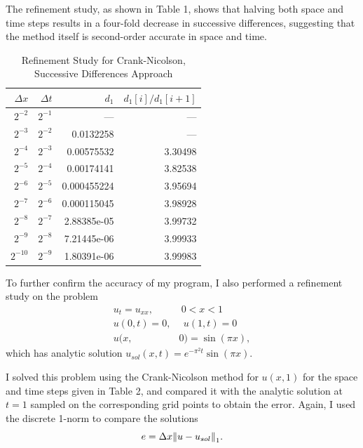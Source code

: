 \documentclass[12pt]{article}
\begin{document}
The refinement study, as shown in Table 1, shows that halving both space and time steps results in a four-fold decrease in successive differences, suggesting that the method itself is second-order accurate in space and time.
\begin{table}[H]
\caption{Refinement Study for Crank-Nicolson, Successive Differences Approach}
\centering\begin{tabular}{||r|r|r|r||}
\hline \hline
     $\Delta x$ &   $\Delta t$ &   $d_1$ &   $d_1[i]/d_1[i+1]$ \\
\hline 
 $2^{-2}$  & $2^{-1}$ & ---          &       ---       \\
 $2^{-3}$  & $2^{-2}$ & 0.0132258   &       --- \\
 $2^{-4}$  & $2^{-3}$ & 0.00575532  &       3.30498 \\
 $2^{-5}$  & $2^{-4}$ & 0.00174141  &       3.82538 \\
 $2^{-6}$  & $2^{-5}$ & 0.000455224 &       3.95694 \\
 $2^{-7}$  & $2^{-6}$ & 0.000115045 &       3.98928 \\
 $2^{-8}$  & $2^{-7}$ & 2.88385e-05 &       3.99732 \\
 $2^{-9}$  & $2^{-8}$ & 7.21445e-06 &       3.99933 \\
 $2^{-10}$ & $2^{-9}$ & 1.80391e-06 &       3.99983 \\
\hline \hline
\end{tabular}
\end{table}

To further confirm the accuracy of my program, I also performed a refinement study on the problem
\begin{align*}
u_t = u_{xx}, &\ 0<x<1 \\
u(0,t)=0, &\ \ u(1,t)=0 \\
u(x,&0) = \sin(\pi x),
\end{align*}
which has analytic solution $u_{sol}(x,t) = e^{-\pi^2 t}\sin(\pi x)$.

I solved this problem using the Crank-Nicolson method for $u(x,1)$ for the space and time steps given in Table 2, and compared it with the analytic solution at $t=1$ sampled on the corresponding grid points to obtain the error.  Again, I used the discrete 1-norm to compare the solutions
$$ e = \Delta x \norm{u - u_{sol}}_1.$$
\end{document}
